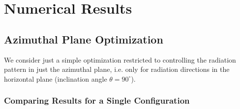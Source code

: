 \documentclass[11pt,letterpaper]{article}
\theoremstyle{definition}
\theoremstyle{plain}
\begin{document}

\section{Numerical Results}
\subsection{Azimuthal Plane Optimization}
We consider just a simple optimization restricted to controlling the radiation pattern in just the azimuthal plane, i.e. only for radiation directions in the horizontal plane (inclination angle $\theta = 90^\circ$). 

\subsubsection{Comparing Results for a Single Configuration}
\end{document}
